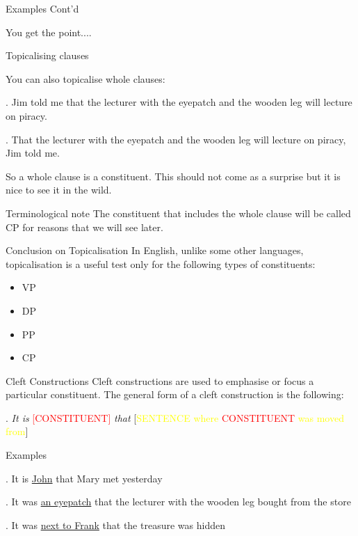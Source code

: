 \begin{frame}
{Examples Cont'd}

  You get the point....
\end{frame}

\begin{frame}
{Topicalising clauses}

You can also topicalise whole clauses:

\ex.
Jim told me that the lecturer with the eyepatch and the wooden leg will lecture on piracy.

\ex.
That the lecturer with the eyepatch and the wooden leg will lecture on piracy, Jim told me.

So a whole clause is a constituent.  This should not come as a surprise but it is nice to see it in the wild.  

\begin{block}
  {Terminological note}
The constituent that includes the whole clause will be called CP for reasons that we will see later.
\end{block}

\end{frame}


\begin{frame}
{Conclusion on Topicalisation}
  In English, unlike some other languages, topicalisation is a useful test only for the following types of constituents:

  \begin{itemize}
  \item VP
  \item DP
  \item PP
  \item CP
  \end{itemize}
\end{frame}

\begin{frame}
  {Cleft Constructions}
Cleft constructions are used to emphasise or focus a particular constituent.  The general form of a cleft construction is the following:

\ex.
\textit{It is} \textcolor{red}{[CONSTITUENT]} \textit{that} [\textcolor{yellow}{SENTENCE where \textcolor{red}{CONSTITUENT} was moved from}]

\end{frame}

\begin{frame}
  {Examples}

\ex.
It is \underline{John} that Mary met  yesterday

\ex.
It was \underline{an eyepatch} that the lecturer with the wooden leg bought  from the store

\ex.
It was \underline{next to Frank} that the treasure was hidden \newline{} 



\end{frame}

